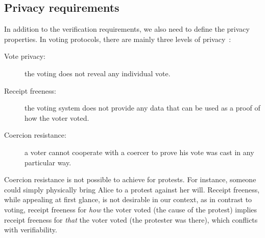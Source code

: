 \subsection{Privacy requirements}%
\label{privacy-properties}

In addition to the verification requirements, we also need to define the privacy properties.
In voting protocols, there are mainly three levels of privacy~\cite{VerifyingPrivacyPropertiesOfVotingProtocols}:
\begin{description}
  \item[Vote privacy:] the voting does not reveal any individual vote.
  \item[Receipt freeness:] the voting system does not provide any data that can be used as a proof of how the voter voted.
  \item[Coercion resistance:] a voter cannot cooperate with a coercer to prove his vote was cast in any particular way.
\end{description}

Coercion resistance is not possible to achieve for protests.
For instance, someone could simply physically bring Alice to a protest against her will.
Receipt freeness, while appealing at first glance, is not desirable in our context, as in contrast to voting, receipt freeness for \emph{how} the voter voted (\ie the cause of the protest) implies receipt freeness for \emph{that} the voter voted (\ie the protester was there), which conflicts with verifiability.



